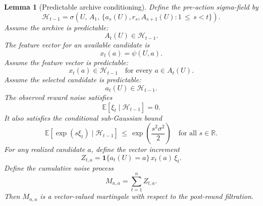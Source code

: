 \documentclass{article} %
\newtheorem{lemma}[theorem]{Lemma}
\begin{document}
\begin{lemma}[Predictable archive conditioning]
\label{lem:3}
Define the pre-action sigma-field by
\begin{equation}
\label{eq:app-filtration-pre}
\mathcal{H}_{t-1}
=
\sigma\!\left(
U,\,
A_1,\,
\{a_s(U),r_s,A_{s+1}(U):1\,\le\, s<t\}
\right).
\end{equation}
Assume the archive is predictable:
\begin{equation}
\label{eq:app-predictable-archive}
A_t(U)\in \mathcal{H}_{t-1}.
\end{equation}
The feature vector for an available candidate is
\begin{equation}
\label{eq:app-feature-definition}
x_t(a)
=
\psi(U,a).
\end{equation}
Assume the feature vector is predictable:
\begin{equation}
\label{eq:app-feature-predictable}
x_t(a)\in \mathcal{H}_{t-1}
\quad
\text{for every }a\in A_t(U).
\end{equation}
Assume the selected candidate is predictable:
\begin{equation}
\label{eq:app-action-predictable}
a_t(U)\in \mathcal{H}_{t-1}.
\end{equation}
The observed reward noise satisfies
\begin{equation}
\label{eq:app-noise-zero-mean}
\mathbb{E}[\xi_t\mid \mathcal{H}_{t-1}]
=
0.
\end{equation}
It also satisfies the conditional sub-Gaussian bound
\begin{equation}
\label{eq:app-noise-subg}
\mathbb{E}\!\left[\exp(s\xi_t)\mid \mathcal{H}_{t-1}\right]
\,\le\,
\exp\!\left(\frac{s^2\sigma^2}{2}\right)
\quad
\text{for all }s\in\mathbb{R}.
\end{equation}
For any realized candidate \(a\), define the vector increment
\begin{equation}
\label{eq:app-mart-increment}
Z_{t,a}
=
\mathbf{1}\{a_t(U)=a\}\,x_t(a)\,\xi_t.
\end{equation}
Define the cumulative noise process
\begin{equation}
\label{eq:app-mart-process}
M_{n,a}
=
\sum_{t=1}^{n}Z_{t,a}.
\end{equation}
Then \(M_{n,a}\) is a vector-valued martingale with respect to the post-round filtration.
\end{lemma}
\end{document}
